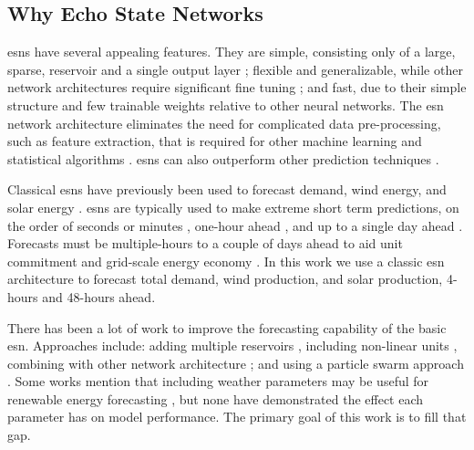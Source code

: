 \subsection{Why Echo State Networks}
\glspl{esn} have several appealing features. They are simple, consisting only
of a large, sparse, reservoir and a single output layer
\cite{lukosevicius_practical_2012}; flexible and generalizable,
while other network architectures require significant fine tuning
\cite{liu_deterministic_2019}; and fast, due to their simple structure and
few trainable weights relative to other neural networks. The \gls{esn} network
architecture eliminates the need for complicated data pre-processing, such as
feature extraction, that is required for other machine learning  and statistical
algorithms \cite{lazos_optimisation_2014, chen_day-ahead_2017}.
\glspl{esn} can also outperform other prediction techniques
\cite{jayawardene_comparison_2014,jayawardene_comparison_2015,shi_energy_2016,chitsazan_wind_2019, hu_forecasting_2020}.

Classical \glspl{esn} have previously been used to forecast demand, wind energy, and solar energy \cite{deihimi_application_2012,jayawardene_comparison_2015,hu_forecasting_2020}.
\glspl{esn} are typically used to make extreme short term predictions, on the
order of seconds or minutes
\cite{chen_novel_2019,wang_echo_2019,chitsazan_wind_2019}, one-hour ahead
\cite{shi_energy_2016}, and up to a single day ahead
\cite{deihimi_application_2012}. Forecasts must be multiple-hours to a
couple of days ahead to aid unit commitment and grid-scale energy economy
\cite{wang_quantifying_2016,mc_garrigle_quantifying_2015,brancucci_martinez-anido_value_2016}. In this work we use a classic \gls{esn} architecture to
forecast total demand, wind production, and solar production, 4-hours and 48-hours ahead.

There has been a lot of work to improve the forecasting capability of
the basic \gls{esn}. Approaches include: adding multiple reservoirs
\cite{hu_forecasting_2020,gallicchio_deep_2019,yao_novel_2019,li_multi-reservoir_2020}, including non-linear units \cite{holzmann_echo_2008, chitsazan_wind_2019}, combining with other network architecture
\cite{chen_novel_2019, lopez_wind_2018}; and using a particle swarm approach \cite{chouikhi_pso-based_2017,wang_echo_2019}. Some works mention that
including weather parameters may be useful for renewable energy forecasting
\cite{li_echo_2019,chitsazan_wind_2019}, but none have demonstrated the effect
each parameter has on model performance. The primary goal of this work
is to fill that gap.

